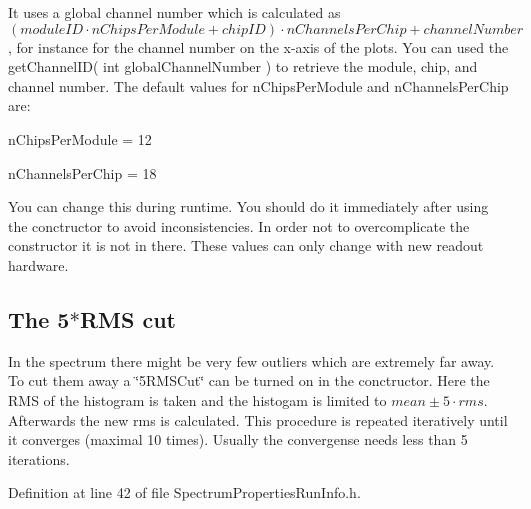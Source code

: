 It uses a global channel number which is calculated as $( moduleID \cdot nChipsPerModule + chipID ) \cdot nChannelsPerChip + channelNumber $, for instance for the channel number on the x-\/axis of the plots. You can used the get\-Channel\-I\-D( int global\-Channel\-Number ) to retrieve the module, chip, and channel number. The default values for {\ttfamily n\-Chips\-Per\-Module} and {\ttfamily n\-Channels\-Per\-Chip} are\-: \begin{DoxyItemize}
\item {\ttfamily n\-Chips\-Per\-Module} = 12 \item {\ttfamily n\-Channels\-Per\-Chip} = 18\end{DoxyItemize}
You can change this during runtime. You should do it immediately after using the conctructor to avoid inconsistencies. In order not to overcomplicate the constructor it is not in there. These values can only change with new readout hardware.\hypertarget{class_spectrum_properties_run_info_FiveRMSCut}{}\subsection{The 5$\ast$\-R\-M\-S cut}\label{class_spectrum_properties_run_info_FiveRMSCut}
In the spectrum there might be very few outliers which are extremely far away. To cut them away a \char`\"{}5\-R\-M\-S\-Cut\char`\"{} can be turned on in the conctructor. Here the R\-M\-S of the histogram is taken and the histogam is limited to $mean \pm 5\cdot rms$. Afterwards the new rms is calculated. This procedure is repeated iteratively until it converges (maximal 10 times). Usually the convergense needs less than 5 iterations. 

Definition at line 42 of file Spectrum\-Properties\-Run\-Info.\-h.



